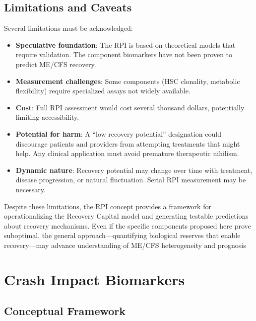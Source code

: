 \subsection{Limitations and Caveats}

Several limitations must be acknowledged:
\begin{itemize}
    \item \textbf{Speculative foundation}: The RPI is based on theoretical models that require validation. The component biomarkers have not been proven to predict ME/CFS recovery.
    \item \textbf{Measurement challenges}: Some components (HSC clonality, metabolic flexibility) require specialized assays not widely available.
    \item \textbf{Cost}: Full RPI assessment would cost several thousand dollars, potentially limiting accessibility.
    \item \textbf{Potential for harm}: A ``low recovery potential'' designation could discourage patients and providers from attempting treatments that might help. Any clinical application must avoid premature therapeutic nihilism.
    \item \textbf{Dynamic nature}: Recovery potential may change over time with treatment, disease progression, or natural fluctuation. Serial RPI measurement may be necessary.
\end{itemize}

Despite these limitations, the RPI concept provides a framework for operationalizing the Recovery Capital model and generating testable predictions about recovery mechanisms. Even if the specific components proposed here prove suboptimal, the general approach---quantifying biological reserves that enable recovery---may advance understanding of ME/CFS heterogeneity and prognosis

\section{Crash Impact Biomarkers}
\label{sec:crash-biomarkers}

\subsection{Conceptual Framework}

